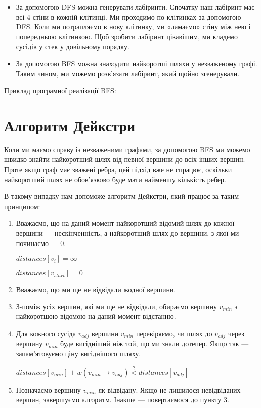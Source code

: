 \documentclass[12pt,a4paper]{report}
\begin{document}
\begin{itemize}
    \item За допомогою DFS можна генерувати лабіринти. Спочатку наш лабіринт має всі 4 стіни в кожній клітинці. Ми проходимо по клітинках за допомогою DFS. Коли ми потрапляємо в нову клітинку, ми «ламаємо» стіну між нею і попередньою клітинкою. Щоб зробити лабіринт цікавішим, ми кладемо сусідів у стек у довільному порядку.
    \item За допомогою BFS можна знаходити найкоротші шляхи у незваженому графі. Таким чином, ми можемо розв’язати лабіринт, який щойно згенерували.
\end{itemize}

Приклад програмної реалізації BFS:





\section{Алгоритм Дейкстри}

Коли ми маємо справу із незваженими графами, за допомогою BFS ми можемо швидко знайти найкоротший шлях від певної вершини до всіх інших вершин. Проте якщо граф має зважені ребра, цей підхід вже не спрацює, оскільки найкоротший шлях не обов’язково буде мати найменшу кількість ребер.

В такому випадку нам допоможе алгоритм Дейкстри, який працює за таким принципом:

\begin{enumerate}
    \item Вважаємо, що на даний момент найкоротший відомий шлях до кожної вершини --- нескінченність, а найкоротший шлях до вершини, з якої ми починаємо --- 0.

          \(distances[v_{i}] = \infty \)

          \(distances[v_{start}] = 0\)

    \item Вважаємо, що ми ще не відвідали жодної вершини.
    \item З-поміж усіх вершин, які ми ще не відвідали, обираємо вершину \(v_{min}\) з найкоротшою відомою на даний момент відстанню.
    \item Для кожного сусіда \(v_{adj}\) вершини \(v_{min}\) перевіряємо, чи шлях до \(v_{adj}\) через вершину \(v_{min}\) буде вигідніший ніж той, що ми знали дотепер.
          Якщо так --- запам’ятовуємо ціну вигіднішого шляху.

          \(distances[v_{min}] + w(v_{min} \rightarrow v_{adj}) \stackrel{?}{<} distances[v_{adj}]\)

    \item Позначаємо вершину \(v_{min}\) як відвідану. Якщо не лишилося невідвіданих вершин, завершуємо алгоритм. Інакше --- повертаємося до пункту 3.
\end{enumerate}
\end{document}
